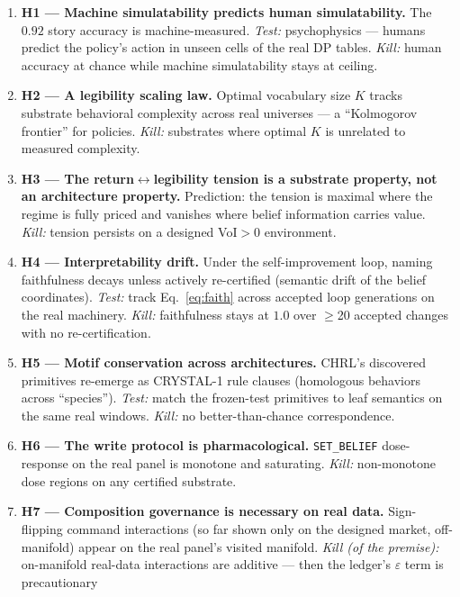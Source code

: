 \documentclass[11pt]{article}
\begin{document}
\begin{enumerate}
  \item \textbf{H1 --- Machine simulatability predicts human simulatability.} The $0.92$ story
        accuracy is machine-measured. \emph{Test:} psychophysics --- humans predict the
        policy's action in unseen cells of the real DP tables. \emph{Kill:} human accuracy at
        chance while machine simulatability stays at ceiling.
  \item \textbf{H2 --- A legibility scaling law.} Optimal vocabulary size $K$ tracks substrate
        behavioral complexity across real universes --- a ``Kolmogorov frontier'' for policies.
        \emph{Kill:} substrates where optimal $K$ is unrelated to measured complexity.
  \item \textbf{H3 --- The return${\leftrightarrow}$legibility tension is a substrate property,
        not an architecture property.} Prediction: the tension is maximal where the regime is
        fully priced and vanishes where belief information carries value. \emph{Kill:} tension
        persists on a designed VoI${>}0$ environment.
  \item \textbf{H4 --- Interpretability drift.} Under the self-improvement loop, naming
        faithfulness decays unless actively re-certified (semantic drift of the belief
        coordinates). \emph{Test:} track Eq.~\ref{eq:faith} across accepted loop generations on
        the real machinery. \emph{Kill:} faithfulness stays at $1.0$ over $\ge$20 accepted
        changes with no re-certification.
  \item \textbf{H5 --- Motif conservation across architectures.} CHRL's discovered primitives
        re-emerge as CRYSTAL-1 rule clauses (homologous behaviors across ``species'').
        \emph{Test:} match the frozen-test primitives to leaf semantics on the same real
        windows. \emph{Kill:} no better-than-chance correspondence.
  \item \textbf{H6 --- The write protocol is pharmacological.} \texttt{SET\_BELIEF}
        dose-response on the real panel is monotone and saturating. \emph{Kill:} non-monotone
        dose regions on any certified substrate.
  \item \textbf{H7 --- Composition governance is necessary on real data.} Sign-flipping command
        interactions (so far shown only on the designed market, off-manifold) appear on the
        real panel's visited manifold. \emph{Kill (of the premise):} on-manifold real-data
        interactions are additive --- then the ledger's $\varepsilon$ term is precautionary

\end{enumerate}
\end{document}
